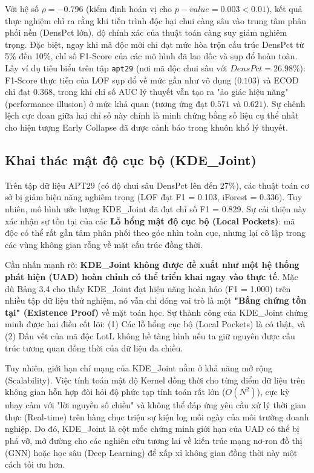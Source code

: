 \documentclass[../main.tex]{subfiles}
\begin{document}
Với hệ số $\rho = -0.796$ (kiểm định hoán vị cho $p-value = 0.003 < 0.01$), kết quả thực nghiệm chỉ ra rằng khi tiến trình độc hại chui càng sâu vào trung tâm phân phối nền (DensPct lớn), độ chính xác của thuật toán càng suy giảm nghiêm trọng. Đặc biệt, ngay khi mã độc mới chỉ đạt mức hòa trộn cấu trúc DensPct từ 5\% đến 10\%, chỉ số F1-Score của các mô hình đã lao dốc và sụp đổ hoàn toàn. Lấy ví dụ tiêu biểu trên tập \texttt{apt29} (nơi mã độc chui sâu với $DensPct = 26.98\%$): F1-Score thực tiễn của LOF sụp đổ về mức gần như vô dụng ($0.103$) và ECOD chỉ đạt $0.368$, trong khi chỉ số AUC lý thuyết vẫn tạo ra "ảo giác hiệu năng" (performance illusion) ở mức khả quan (tương ứng đạt $0.571$ và $0.621$). Sự chênh lệch cực đoan giữa hai chỉ số này chính là minh chứng bằng số liệu cụ thể nhất cho hiện tượng Early Collapse đã được cảnh báo trong khuôn khổ lý thuyết.

\subsection{Khai thác mật độ cục bộ (KDE\_Joint)}
Trên tập dữ liệu APT29 (có độ chui sâu DensPct lên đến $27\%$), các thuật toán cơ sở bị giảm hiệu năng nghiêm trọng (LOF đạt F1 = 0.103, iForest = 0.336). Tuy nhiên, mô hình ước lượng KDE\_Joint đã đạt chỉ số F1 = 0.829. Sự cải thiện này xác nhận sự tồn tại của các \textbf{Lỗ hổng mật độ cục bộ (Local Pockets)}: mã độc có thể rất gần tâm phân phối theo góc nhìn toàn cục, nhưng lại cô lập trong các vùng không gian rỗng về mặt cấu trúc đồng thời. 

Cần nhấn mạnh rõ: \textbf{KDE\_Joint không được đề xuất như một hệ thống phát hiện (UAD) hoàn chỉnh có thể triển khai ngay vào thực tế}. Mặc dù Bảng 3.4 cho thấy KDE\_Joint đạt hiệu năng hoàn hảo (F1 = 1.000) trên nhiều tập dữ liệu thử nghiệm, nó vẫn chỉ đóng vai trò là một \textbf{"Bằng chứng tồn tại" (Existence Proof)} về mặt toán học. Sự thành công của KDE\_Joint chứng minh được hai điều cốt lõi: (1) Các lỗ hổng cục bộ (Local Pockets) là có thật, và (2) Dấu vết của mã độc LotL không hề tàng hình nếu ta giữ nguyên được cấu trúc tương quan đồng thời của dữ liệu đa chiều.

Tuy nhiên, giới hạn chí mạng của KDE\_Joint nằm ở khả năng mở rộng (Scalability). Việc tính toán mật độ Kernel đồng thời cho từng điểm dữ liệu trên không gian hỗn hợp đòi hỏi độ phức tạp tính toán rất lớn ($O(N^2)$), cực kỳ nhạy cảm với "lời nguyền số chiều" và không thể đáp ứng yêu cầu xử lý thời gian thực (Real-time) trên hàng chục triệu sự kiện log mỗi ngày của môi trường doanh nghiệp. Do đó, KDE\_Joint là cột mốc chứng minh giới hạn của UAD có thể bị phá vỡ, mở đường cho các nghiên cứu tương lai về kiến trúc mạng nơ-ron đồ thị (GNN) hoặc học sâu (Deep Learning) để xấp xỉ không gian đồng thời này một cách tối ưu hơn.
\end{document}
